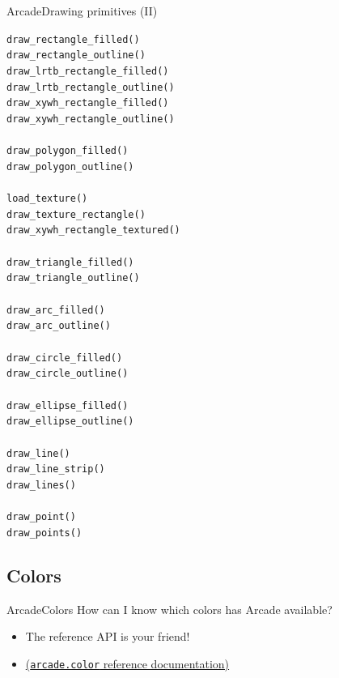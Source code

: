\documentclass[10pt,compress]{beamer} %
\begin{document}
\begin{frame}[shrink]{Arcade}{Drawing primitives (II)}
  	\begin{multicols}{2}
		\texttt{draw\_rectangle\_filled()}\\	
		\texttt{draw\_rectangle\_outline()}\\
		\texttt{draw\_lrtb\_rectangle\_filled()}\\
		\texttt{draw\_lrtb\_rectangle\_outline()}\\
		\texttt{draw\_xywh\_rectangle\_filled()}\\
		\texttt{draw\_xywh\_rectangle\_outline()}\\
		\texttt{ }\\
		\texttt{draw\_polygon\_filled()}\\
		\texttt{draw\_polygon\_outline()}\\
		\texttt{ }\\
		\texttt{load\_texture()}\\
		\texttt{draw\_texture\_rectangle()}\\
		\texttt{draw\_xywh\_rectangle\_textured()}\\
		\texttt{ }\\
		\texttt{draw\_triangle\_filled()}\\
		\texttt{draw\_triangle\_outline()}\\
		\texttt{ }\\
		\texttt{draw\_arc\_filled()}\\
		\texttt{draw\_arc\_outline()}\\
		\texttt{ }\\
		\texttt{draw\_circle\_filled()}\\
		\texttt{draw\_circle\_outline()}\\
		\texttt{ }\\
		\texttt{draw\_ellipse\_filled()}\\
		\texttt{draw\_ellipse\_outline()}\\
		\texttt{ }\\
		\texttt{draw\_line()}\\
		\texttt{draw\_line\_strip()}\\
		\texttt{draw\_lines()}\\
		\texttt{ }\\
		\texttt{draw\_point()}\\
		\texttt{draw\_points()}
	\end{multicols}
\end{frame}

\subsection{Colors}
\begin{frame}{Arcade}{Colors}
	How can I know which colors has Arcade available?
	\begin{itemize}
		\item The reference API is your friend!
		\item \href{https://api.arcade.academy/en/latest/arcade.color.html}{(\texttt{arcade.color} reference documentation)}
	\end{itemize}


\end{frame}
\end{document}
